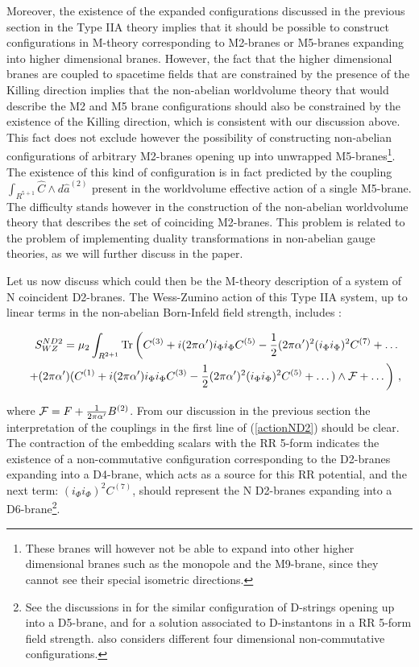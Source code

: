\documentclass[12pt,a4paper]{article}
\begin{document}
Moreover, the existence of the expanded configurations discussed
in the previous section in
the Type IIA theory implies that it should be possible to construct
configurations in M-theory
corresponding to M2-branes or M5-branes
expanding into higher dimensional branes. However, the fact that
the higher dimensional branes are coupled to spacetime
fields that are constrained by the presence of the Killing direction  
implies that the non-abelian worldvolume theory that would describe 
the M2 and M5 brane
configurations should also be constrained by the existence of the 
Killing direction, which is consistent with our discussion above.
This fact does not exclude however the possibility of 
constructing non-abelian configurations of arbitrary
M2-branes opening up into unwrapped M5-branes\footnote{These 
branes will however not be able to expand into other higher 
dimensional branes such as the monopole and the
M9-brane, since they cannot see their special isometric directions.}.
The existence
of this kind of configuration is in fact predicted by the coupling
$\int_{R^{5+1}} {\hat C}\wedge d{\hat a}^{(2)}$ present in the
worldvolume effective action of a single M5-brane. The difficulty stands
however in the construction of the non-abelian worldvolume theory 
that describes
the set of coinciding M2-branes. This problem is related to the problem of
implementing duality transformations in non-abelian gauge
theories, as we will further discuss in the paper.


Let us now discuss which could then be the
M-theory description of a system of
N coincident D2-branes. The Wess-Zumino action of this Type IIA system,
up to linear terms in the non-abelian Born-Infeld field strength, 
includes \cite{Myers}:

\begin{eqnarray}
\label{actionND2}
&&S^{ND2}_{WZ}=\mu_2\int_{R^{2+1}}{\rm Tr}\left(C^{(3)}+
i(2\pi\alpha^\prime)i_\Phi i_\Phi C^{(5)}-\frac12 (2\pi\alpha^\prime)^2
(i_\Phi i_\Phi)^2 C^{(7)}+\dots\right.\nonumber\\
&&\left.
+(2\pi\alpha^\prime)(C^{(1)}+i(2\pi\alpha^\prime)i_\Phi i_\Phi C^{(3)}
-\frac12 (2\pi\alpha^\prime)^2 (i_\Phi i_\Phi)^2 C^{(5)}+\dots)
\wedge {\cal F}+\dots\right)\, ,
\end{eqnarray}

\noindent where ${\cal F}=F+\frac{1}{2\pi\alpha^\prime}B^{(2)}$.
From our discussion in the previous section the interpretation
of the couplings in the first line of (\ref{actionND2}) should be clear. 
The contraction of the embedding scalars with the RR 5-form 
indicates the existence of a non-commutative configuration 
corresponding to the D2-branes expanding into a D4-brane, which acts
as a source for this RR potential, and the next term:
$(i_\Phi i_\Phi)^2 C^{(7)}$, should represent the N D2-branes
expanding into a D6-brane\footnote{See the discussions in \cite{CMT} for 
the similar configuration of D-strings opening up into a D5-brane,
and \cite{GJS} for a solution associated to D-instantons in a RR
5-form field strength. \cite{TV} also considers different four
dimensional non-commutative configurations.}.
 
\end{document}
